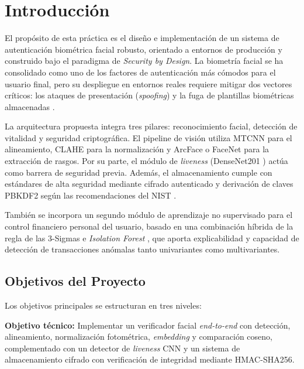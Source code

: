 \section{Introducción}
\label{sec:introduccion}

El propósito de esta práctica es el diseño e implementación de un sistema de autenticación biométrica facial robusto, orientado a entornos de producción y construido bajo el paradigma de \textit{Security by Design}. La biometría facial se ha consolidado como uno de los factores de autenticación más cómodos para el usuario final, pero su despliegue en entornos reales requiere mitigar dos vectores críticos: los ataques de presentación (\textit{spoofing}) y la fuga de plantillas biométricas almacenadas \cite{ramachandra2017pad}.

La arquitectura propuesta integra tres pilares: reconocimiento facial, detección de vitalidad y seguridad criptográfica. El pipeline de visión utiliza MTCNN \cite{zhang2016mtcnn} para el alineamiento,  CLAHE para la normalización y ArcFace \cite{deng2019arcface} o FaceNet \cite{schroff2015facenet} para la extracción de rasgos. Por su parte, el módulo de \textit{liveness} (DenseNet201 \cite{huang2017densenet}) actúa como barrera de seguridad previa. Además, el almacenamiento cumple con estándares de alta seguridad mediante cifrado autenticado y derivación de claves PBKDF2 según las recomendaciones del NIST \cite{nist800132}.

También se incorpora un segundo módulo de aprendizaje no supervisado para el control financiero personal del usuario, basado en una combinación híbrida de la regla de las 3-Sigmas e \textit{Isolation Forest} \cite{liu2008isolation}, que aporta explicabilidad y capacidad de detección de transacciones anómalas tanto univariantes como multivariantes.

\subsection{Objetivos del Proyecto}
\label{subsec:objetivos}

Los objetivos principales se estructuran en tres niveles:

\textbf{Objetivo técnico:} Implementar un verificador facial \textit{end-to-end} con detección, alineamiento, normalización fotométrica, \textit{embedding} y comparación coseno, complementado con un detector de \textit{liveness} CNN y un sistema de almacenamiento cifrado con verificación de integridad mediante HMAC-SHA256.

